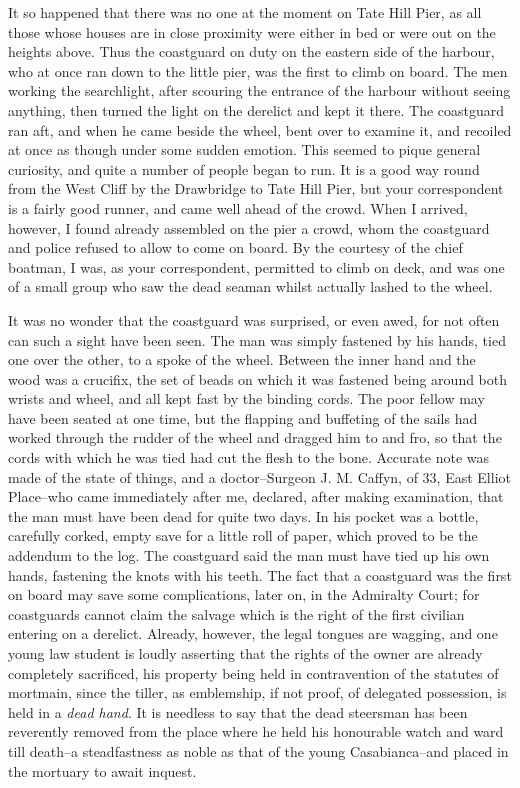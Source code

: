 \documentclass[12pt,openright]{book}
\begin{document}
It so happened that there was no one at the moment on Tate Hill Pier, as all those whose houses are in close proximity were either in bed or were out on the heights above. Thus the coastguard on duty on the eastern side of the harbour, who at once ran down to the little pier, was the first to climb on board. The men working the searchlight, after scouring the entrance of the harbour without seeing anything, then turned the light on the derelict and kept it there. The coastguard ran aft, and when he came beside the wheel, bent over to examine it, and recoiled at once as though under some sudden emotion. This seemed to pique general curiosity, and quite a number of people began to run. It is a good way round from the West Cliff by the Drawbridge to Tate Hill Pier, but your correspondent is a fairly good runner, and came well ahead of the crowd. When I arrived, however, I found already assembled on the pier a crowd, whom the coastguard and police refused to allow to come on board. By the courtesy of the chief boatman, I was, as your correspondent, permitted to climb on deck, and was one of a small group who saw the dead seaman whilst actually lashed to the wheel.

It was no wonder that the coastguard was surprised, or even awed, for not often can such a sight have been seen. The man was simply fastened by his hands, tied one over the other, to a spoke of the wheel. Between the inner hand and the wood was a crucifix, the set of beads on which it was fastened being around both wrists and wheel, and all kept fast by the binding cords. The poor fellow may have been seated at one time, but the flapping and buffeting of the sails had worked through the rudder of the wheel and dragged him to and fro, so that the cords with which he was tied had cut the flesh to the bone. Accurate note was made of the state of things, and a doctor–Surgeon J. M. Caffyn, of 33, East Elliot Place–who came immediately after me, declared, after making examination, that the man must have been dead for quite two days. In his pocket was a bottle, carefully corked, empty save for a little roll of paper, which proved to be the addendum to the log. The coastguard said the man must have tied up his own hands, fastening the knots with his teeth. The fact that a coastguard was the first on board may save some complications, later on, in the Admiralty Court; for coastguards cannot claim the salvage which is the right of the first civilian entering on a derelict. Already, however, the legal tongues are wagging, and one young law student is loudly asserting that the rights of the owner are already completely sacrificed, his property being held in contravention of the statutes of mortmain, since the tiller, as emblemship, if not proof, of delegated possession, is held in a \textit{dead hand}. It is needless to say that the dead steersman has been reverently removed from the place where he held his honourable watch and ward till death–a steadfastness as noble as that of the young Casabianca–and placed in the mortuary to await inquest.
\end{document}

